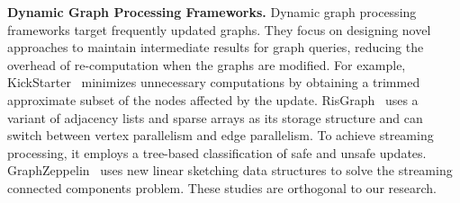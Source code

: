 \noindent\textbf{Dynamic Graph Processing Frameworks.} Dynamic graph processing frameworks target frequently updated graphs. They focus on designing novel approaches to maintain intermediate results for graph queries, reducing the overhead of re-computation when the graphs are modified. For example, KickStarter~\cite{vora2017kickstarter} minimizes unnecessary computations by obtaining a trimmed approximate subset of the nodes affected by the update. RisGraph~\cite{feng2021risgraph} uses a variant of adjacency lists and sparse arrays as its storage structure and can switch between vertex parallelism and edge parallelism. To achieve streaming processing, it employs a tree-based classification of safe and unsafe updates. GraphZeppelin~\cite{tench2022graphzeppelin} uses new linear sketching data structures to solve the streaming connected components problem. These studies are orthogonal to our research.





